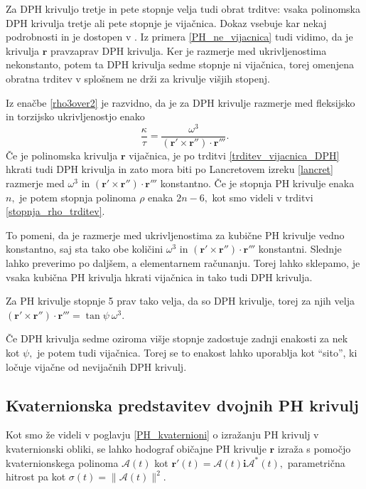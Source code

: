 \documentclass[12pt,a4paper,twoside]{article}
\theoremstyle{definition} %
\theoremstyle{plain} %
\theoremstyle{primerstyle}
\numberwithin{equation}{section}  %
\newcommand{\rV}{\mathbf{r}}
\newcommand{\iV}{\mathbf{i}}
\newcommand{\AQ}{\mathcal{A}}
\begin{document}
Za DPH krivuljo tretje in pete stopnje velja tudi obrat trditve: vsaka polinomska DPH krivulja tretje ali pete stopnje je vijačnica. Dokaz vsebuje kar nekaj podrobnosti in je dostopen v \cite{beltranmonterde}. Iz primera \ref{PH_ne_vijacnica} tudi vidimo, da je krivulja $\rV$ pravzaprav DPH krivulja. Ker je razmerje med ukrivljenostima nekonstanto, potem ta DPH krivulja sedme stopnje ni vijačnica, torej omenjena obratna trditev v splošnem ne drži za krivulje višjih stopenj.

Iz enačbe \eqref{rho3over2} je razvidno, da je za DPH krivulje razmerje med fleksijsko in torzijsko ukrivljenostjo enako
\begin{equation}
	\frac{\kappa}{\tau}=\frac{\omega^3}{(\rV'\times\rV'')\cdot\rV'''}.
\end{equation}
Če je polinomska krivulja $\rV$ vijačnica, je po trditvi \ref{trditev_vijacnica_DPH} hkrati tudi DPH krivulja in zato mora biti po Lancretovem izreku \ref{lancret} razmerje med $\omega^3$ in $(\rV'\times\rV'')\cdot\rV'''$ konstantno. Če je stopnja PH krivulje enaka $n,$ je potem stopnja polinoma $\rho	$ enaka $2n-6,$ kot smo videli v trditvi \ref{stopnja_rho_trditev}. 

To pomeni, da je razmerje med ukrivljenostima za kubične PH krivulje vedno konstantno, saj sta tako obe količini $\omega^3$ in $(\rV'\times\rV'')\cdot\rV'''$ konstantni. Slednje lahko preverimo po daljšem, a elementarnem računanju. Torej lahko sklepamo, je vsaka kubična PH krivulja hkrati vijačnica in tako tudi DPH krivulja. 

Za PH krivulje stopnje 5 prav tako velja, da so DPH krivulje, torej za njih velja $(\rV'\times\rV'')\cdot\rV'''=\tan \psi\ \omega^3.$ 

Če DPH krivulja sedme oziroma višje stopnje zadostuje zadnji enakosti za nek kot $\psi,$ je potem tudi vijačnica. Torej se to enakost lahko uporablja kot ``sito'', ki ločuje vijačne od nevijačnih DPH krivulj.

\subsection{Kvaternionska predstavitev dvojnih PH krivulj}

Kot smo že videli v poglavju \ref{PH_kvaternioni} o izražanju PH krivulj v kvaternionski obliki, se lahko hodograf običajne PH krivulje $\rV$ izraža s pomočjo kvaternionskega polinoma $\AQ(t)$ kot $\rV'(t)=\AQ(t)\iV\AQ^*(t),$ parametrična hitrost pa kot $\sigma(t)=\lVert \AQ(t) \rVert^2.$ 
\end{document}
